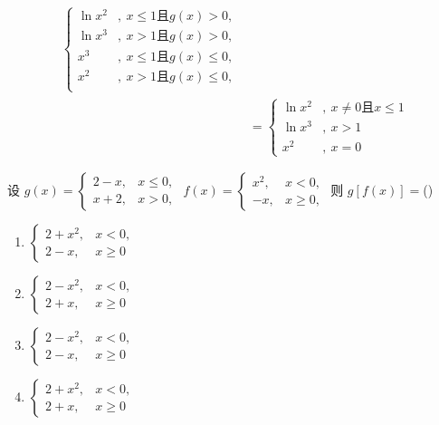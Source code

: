 \begin{Answer}
\begin{align*}
\begin{cases}
            \ln x^2&,\ x \le 1\text{且}g(x)>0,\\
            \ln x^3&,\ x > 1\text{且}g(x)>0,\\
            x^3&,\ x\le 1\text{且} g(x)\le 0,\\
            x^2&,\ x>1 \text{且} g(x)\le 0,\\
        \end{cases}\\
        &= \begin{cases}
            \ln x^2&,\ x \neq 0 \text{且}x \le 1\\
            \ln x^3&,\ x >1\\
            x^2&,\ x = 0
        \end{cases}
    \end{align*}
\end{Answer}
\begin{Problem}
        设 \( g(x)=\begin{cases} 2-x, & x \leq 0, \\ x+2, & x>0, \end{cases} \)
    \( f(x)=\begin{cases} x^2, & x<0, \\ -x, & x \geq 0, \end{cases} \)
    则 \( g[f(x)]=\)(\phantom{5em})
    \begin{enumerate}[label=(\Alph*)]
        \item \( \begin{cases} 2+x^2, & x<0, \\ 2-x, & x \geq 0 \end{cases} \)
        \item \( \begin{cases} 2-x^2, & x<0, \\ 2+x, & x \geq 0 \end{cases} \)
        \item \( \begin{cases} 2-x^2, & x<0, \\ 2-x, & x \geq 0 \end{cases} \)
        \item \( \begin{cases} 2+x^2, & x<0, \\ 2+x, & x \geq 0 \end{cases} \)
    \end{enumerate}
\end{Problem}
